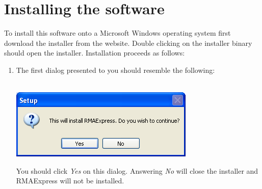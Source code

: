 \documentclass[11pt]{report}
\begin{document}
\section{Installing the software}

To install this software onto a Microsoft Windows operating system first download the installer from the website. Double clicking on the installer binary should open the installer. Installation proceeds as follows:
\begin{enumerate}
\item The first dialog presented to you should resemble the following:\\ \\
\begin{center}
\includegraphics[scale=0.75]{install0}
\end{center}

You should click {\it Yes} on this dialog. Answering {\it No} will close the installer and RMAExpress will not be installed. 


\end{enumerate}
\end{document}
